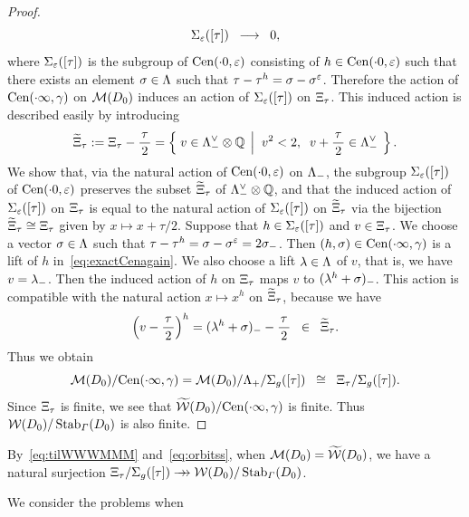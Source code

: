 \documentclass{amsart} %
\begin{document}
\begin{proof}
\begin{equation}
\Sigma_{\varepsilon}([\tau])
\;\; \longrightarrow \;\; 0,
\end{equation}
%
where $\Sigma_{\varepsilon}([\tau])$ is the subgroup of $\mathrm{Cen}(\cdot 0, \varepsilon)$
consisting of $h\in \mathrm{Cen}(\cdot 0, \varepsilon)$ such that 
there exists an element $\sigma\in \Lambda$ such that $\tau-\tau^h=\sigma-\sigma^{\varepsilon}$.
Therefore the action 
of $\mathrm{Cen}(\cdot \infty, \gamma)$ on $\mathord{\mathcal{M}}(D_0)$ induces an action of 
$\Sigma_{\varepsilon}([\tau])$ on $\Xi_{\tau}$. 
This induced action is described easily by introducing 
%
\begin{equation}\label{eq:tilXi}
\widetilde{\Xi}_{\tau}:=\Xi_{\tau} -\dfrac{\tau}{\,2\,}
=\left\{\; {v\in \Lambda_{-}^{\vee}\otimes\mathord{\mathbb{Q}}} \; \left\vert \; {\;v^2<2, \;\; v+\dfrac{\tau}{\,2\,}\in \Lambda_{-}^{\vee}} \; \right.\right \}.
\end{equation}
%
We show that, via the natural action of $\mathrm{Cen}(\cdot 0, \varepsilon)$ on $\Lambda_{-}$,
the subgroup 
$\Sigma_{\varepsilon}([\tau])$ of $\mathrm{Cen}(\cdot 0, \varepsilon)$
preserves the subset $\widetilde{\Xi}_{\tau}$ of $\Lambda_{-}^{\vee}\otimes\mathord{\mathbb{Q}}$,
and that 
the induced action of 
$\Sigma_{\varepsilon}([\tau])$ on $\Xi_{\tau}$
is equal to the natural action of $\Sigma_{\varepsilon}([\tau])$ on $\widetilde{\Xi}_{\tau}$
via the 
bijection $\widetilde{\Xi}_{\tau}\cong \Xi_{\tau}$ given by 
$x\mapsto x+\tau/2$.
Suppose that $h\in \Sigma_{\varepsilon}([\tau])$ and $v\in \Xi_{\tau}$.
We choose a vector $\sigma\in \Lambda$ such that $\tau-\tau^h=\sigma-\sigma^\varepsilon=2\sigma_{-}$.
Then $(h, \sigma)\in \mathrm{Cen}(\cdot \infty, \gamma)$ is a lift of $h$ in~\eqref{eq:exactCenagain}.
We also choose a lift $\lambda\in \Lambda$ of $v$,
that is, we have $v=\lambda\sb{-}$.
Then the induced action of $h$ on $\Xi_{\tau}$ maps $v$ to $(\lambda^h+\sigma)\sb{-}$.
This action is compatible with the natural action $x\mapsto x^h$ on $\widetilde{\Xi}_{\tau}$, because we have 
\[
\left(v-\dfrac{\tau}{\,2\,}\right)^h=(\lambda^h+\sigma)_{-}-\dfrac{\tau}{\,2\,}\;\;\in\;\;\widetilde{\Xi}_{\tau}.
\]
 Thus we obtain 
%
\begin{equation}\label{eq:orbitss}
 \mathord{\mathcal{M}}(D_0)/\mathrm{Cen}(\cdot \infty, \gamma)= \mathord{\mathcal{M}}(D_0)/\Lambda_{+}/\Sigma_{g}([\tau])\;\;\cong\;\; \Xi_{\tau}/\Sigma_{g}([\tau]). 
\end{equation}
%
Since $\Xi_{\tau}$ is finite, 
we see that 
$\widetilde{\mathord{\mathcal{W}}}(D_0)/\mathrm{Cen}(\cdot \infty, \gamma)$ is finite. 
Thus $\mathord{\mathcal{W}}(D_0)/\operatorname{Stab}_{\varGamma}(D_0)$ is also finite. 
%
\end{proof}
%
\begin{remark}\label{rem:orbitss}
By~\eqref{eq:tilWWWMMM} and~\eqref{eq:orbitss},
when $ \mathord{\mathcal{M}}(D_0)=\widetilde{\mathord{\mathcal{W}}}(D_0)$, 
we have 
a natural surjection 
$ \Xi_{\tau}/\Sigma_{g}([\tau]) \mathrel{\rightarrow\!\!\!\!\rightarrow} \mathord{\mathcal{W}}(D_0)/\operatorname{Stab}_{\varGamma}(D_0)$.
\end{remark}
%
We consider the problems when 
\end{document}
